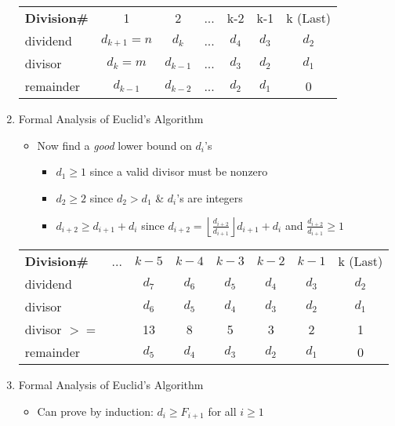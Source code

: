 \begin{enumerate}
  \begin{tabular}{l c c c c c c}
  \rowcolor{LightCyan} \textbf{Division\#} & 1   & 2   & ...   & k-2   & k-1  & k (Last) \\
  \rowcolor{DarkCyan} dividend            & $d_{k+1}=n$ & $d_{k}$ & ... & $d_{4}$ & $d_{3}$ & $d_{2}$ \\
  \rowcolor{LightCyan} divisor            & $d_{k}=m$ & $d_{k-1}$ & ... & $d_{3}$  & $d_{2}$ & $d_{1}$ \\
  \rowcolor{DarkCyan} remainder           & $d_{k-1}$ & $d_{k-2}$ & ...  & $d_{2}$  & $d_{1}$  & 0 \\
  \end{tabular}
\item Formal Analysis of Euclid's Algorithm
  \begin{itemize}
  \item Now find a \emph{good} lower bound on $d_{i}$'s
    \begin{itemize}
    \item $d_{1}\geq 1$   since a valid divisor must be nonzero
    \item $d_{2}\geq 2$   since $d_{2}>d_{1}$ \& $d_{i}$'s are integers
    \item $d_{i+2}\geq d_{i+1} +d_{i}$ since $d_{i+2}=\left\lfloor\frac{d_{i+2}}{d_{i+1}}\right\rfloor d_{i+1}+d_{i}$ and $\frac{d_{i+2}}{d_{i+1}}\geq 1$
    \end{itemize}
  \end{itemize}
  \begin{tabular}{l c c c c c c c}
  \rowcolor{LightCyan} \textbf{Division\#} & ... & $k-5$ & $k-4$ & $k-3$ & $k-2$  & $k-1$ & k (Last) \\
  \rowcolor{DarkCyan} dividend & & $d_{7}$ & $d_{6}$ & $d_{5}$ & $d_{4}$ & $d_{3}$ & $d_{2}$ \\
  \rowcolor{LightCyan} divisor & & $d_{6}$ & $d_{5}$ & $d_{4}$ & $d_{3}$ & $d_{2}$ & $d_{1}$ \\
  \rowcolor{DarkCyan} divisor $>=$ & & 13 & 8 & 5 & 3 & 2 & 1 \\
  \rowcolor{LightCyan} remainder & & $d_{5}$ & $d_{4}$ & $d_{3}$ & $d_{2}$ & $d_{1}$ & 0 \\
  \end{tabular}
\item Formal Analysis of Euclid's Algorithm
  \begin{itemize}
  \item Can prove by induction: $d_{i}\geq F_{i+1}$ for all $i\geq 1$
    \begin{itemize}

\end{itemize}
\end{itemize}
\end{enumerate}
